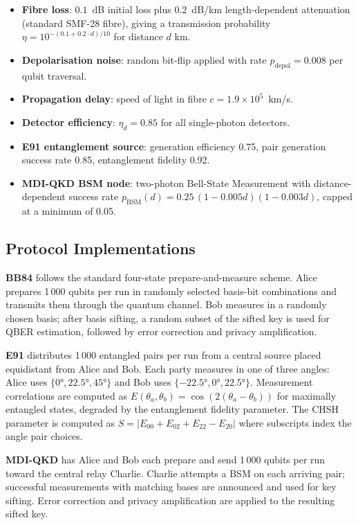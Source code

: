 \documentclass[conference]{IEEEtran}
\begin{document}
\begin{itemize}
  \item \textbf{Fibre loss}: $0.1$~dB initial loss plus $0.2$~dB/km length-dependent
        attenuation (standard SMF-28 fibre), giving a transmission probability
        $\eta = 10^{-(0.1 + 0.2 \cdot d)/10}$ for distance $d$ km.
  \item \textbf{Depolarisation noise}: random bit-flip applied with rate
        $p_\text{depol} = 0.008$ per qubit traversal.
  \item \textbf{Propagation delay}: speed of light in fibre $c = 1.9 \times 10^5$~km/s.
  \item \textbf{Detector efficiency}: $\eta_d = 0.85$ for all single-photon detectors.
  \item \textbf{E91 entanglement source}: generation efficiency 0.75, pair
        generation success rate 0.85, entanglement fidelity 0.92.
  \item \textbf{MDI-QKD BSM node}: two-photon Bell-State Measurement with
        distance-dependent success rate
        $p_\text{BSM}(d) = 0.25\,(1-0.005d)(1-0.003d)$, capped at a minimum
        of 0.05.
\end{itemize}

\subsection{Protocol Implementations}

\textbf{BB84} follows the standard four-state prepare-and-measure scheme.
Alice prepares 1\,000 qubits per run in randomly selected basis-bit
combinations and transmits them through the quantum channel. Bob measures in
a randomly chosen basis; after basis sifting, a random subset of the sifted
key is used for QBER estimation, followed by error correction and privacy
amplification.

\textbf{E91} distributes 1\,000 entangled pairs per run from a central source
placed equidistant from Alice and Bob. Each party measures in one of three
angles: Alice uses $\{0°, 22.5°, 45°\}$ and Bob uses $\{-22.5°, 0°, 22.5°\}$.
Measurement correlations are computed as $E(\theta_a, \theta_b)=\cos
(2(\theta_a - \theta_b))$ for maximally entangled states, degraded by
the entanglement fidelity parameter. The CHSH parameter is computed as
$S = |E_{00} + E_{02} + E_{22} - E_{20}|$ where subscripts index the angle
pair choices.

\textbf{MDI-QKD} has Alice and Bob each prepare and send 1\,000 qubits per
run toward the central relay Charlie. Charlie attempts a BSM on each arriving
pair; successful measurements with matching bases are announced and used for
key sifting. Error correction and privacy amplification are applied to
the resulting sifted key.
\end{document}
